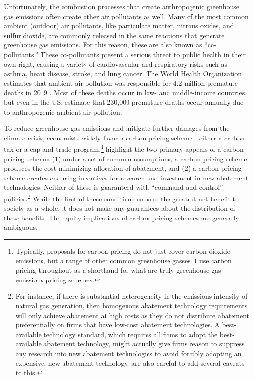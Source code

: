 \documentclass[11pt]{article}
\begin{document}
Unfortunately, the combustion processes that create anthropogenic greenhouse gas emissions often create other air pollutants as well. Many of the most common ambient (outdoor) air pollutants, like particulate matter, nitrous oxides, and sulfur dioxide, are commonly released in the same reactions that generate greenhouse gas emissions. For this reason, these are also known as ``co-pollutants.'' These co-pollutants present a serious threat to public health in their own right, causing a variety of cardiovascular and respiratory risks such as asthma, heart disease, stroke, and lung cancer. The World Health Organization estimates that ambient air pollution was responsible for 4.2 million premature deaths in 2019 \citep{who_factsheet}. Most of these deaths occur in low- and middle-income countries, but even in the US, \cite{lelieveld2019effects} estimate that 230,000 premature deaths occur annually due to anthropogenic ambient air pollution.

To reduce greenhouse gas emissions and mitigate further damages from the climate crisis, economists widely favor a carbon pricing scheme---either a carbon tax or a cap-and-trade program.\footnote{Typically, proposals for carbon pricing do not just cover carbon dioxide emissions, but a range of other common greenhouse gasses. I use carbon pricing throughout as a shorthand for what are truly greenhouse gas emissions pricing schemes.} \cite{keohane2016markets} highlight the two primary appeals of a carbon pricing scheme: (1) under a set of common assumptions, a carbon pricing scheme produces the cost-minimizing allocation of abatement, and (2) a carbon pricing scheme creates enduring incentives for research and investment in new abatement technologies. Neither of these is guaranteed with ``command-and-control'' policies.\footnote{
	For instance, if there is substantial heterogeneity in the emissions intensity of natural gas generation, then homogenous abatement technology requirements will only achieve abatement at high costs as they do not distribute abatement preferentially on firms that have low-cost abatement technologies. A best-available technology standard, which requires all firms to adopt the best-available abatement technology, might actually give firms reason to suppress any research into new abatement technologies to avoid forcibly adopting an expensive, new abatement technology. \cite{keohane2016markets} are also careful to add several caveats to this.
} While the first of these conditions ensures the greatest net benefit to society as a whole, it does not make any guarantees about the distribution of these benefits. The equity implications of carbon pricing schemes are generally ambiguous.  
\end{document}
